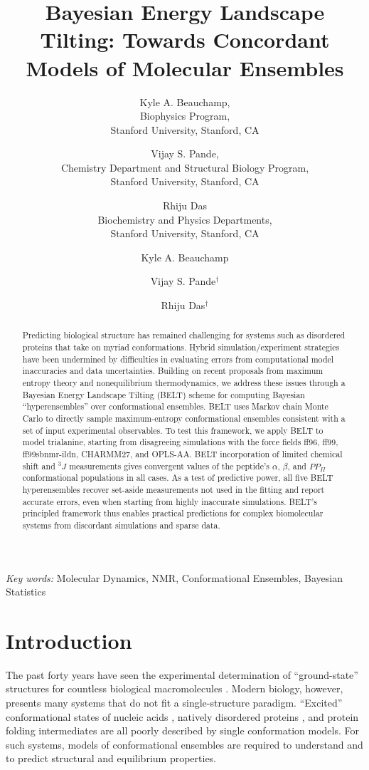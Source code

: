\documentclass[journal=jacsat,manuscript=article]{achemso}
\author{Kyle A. Beauchamp, \\
Biophysics Program, \\
Stanford University, Stanford, CA
\and Vijay S. Pande, \\
Chemistry Department and Structural Biology Program, \\
Stanford University, Stanford, CA
\and Rhiju Das \\
Biochemistry and Physics Departments, \\
Stanford University, Stanford, CA
}
\author{Kyle A. Beauchamp}
\affiliation[Biophysics Program]{Biophysics Program}
\author{Vijay S. Pande$^\dagger$}
\affiliation[Chemistry Department]{Chemistry Department, Stanford University, Stanford, CA}
\author{Rhiju Das$^\dagger$}
\affiliation[Biochemistry Department]{Biochemistry Department, Stanford University, Stanford, CA}
\title{Bayesian Energy Landscape Tilting: Towards Concordant Models of Molecular Ensembles}
\begin{document}
\maketitle

\begin{abstract}

Predicting biological structure has remained challenging for systems such as disordered proteins that take on myriad conformations. Hybrid simulation/experiment strategies have been undermined by difficulties in evaluating errors from computational model inaccuracies and data uncertainties. Building on recent proposals from maximum entropy theory and nonequilibrium thermodynamics, we address these issues through a Bayesian Energy Landscape Tilting (BELT) scheme for computing Bayesian \enquote{hyperensembles} over conformational ensembles.  BELT uses Markov chain Monte Carlo to directly sample maximum-entropy conformational ensembles consistent with a set of input experimental observables.  To test this framework, we apply BELT to model trialanine, starting from disagreeing simulations with the force fields ff96, ff99, ff99sbnmr-ildn, CHARMM27, and OPLS-AA. BELT incorporation of limited chemical shift and $^3J$ measurements gives convergent values of the peptide's $\alpha$, $\beta$, and $PP_{II}$ 
conformational populations in all cases. As a test of predictive power, all five BELT hyperensembles recover set-aside measurements not used in the fitting and report accurate errors, even when starting from highly inaccurate simulations. BELT's principled framework thus enables practical predictions for complex biomolecular systems from discordant simulations and sparse data.   

\end{abstract}

\emph{Key words:} Molecular Dynamics, NMR, Conformational Ensembles,  Bayesian Statistics

\section*{Introduction}

The past forty years have seen the experimental determination of ``ground-state'' structures for countless biological macromolecules \cite{Berman2000}. Modern biology, however, presents many systems that do not fit a single-structure paradigm.  ``Excited'' conformational states of nucleic acids \cite{dethoff2012}, natively disordered proteins \cite{fink2005}, and protein folding intermediates \cite{korzhnev2004} are all poorly described by single conformation models.  For such systems, models of conformational ensembles are required to understand and to predict structural and equilibrium properties.  
\end{document}
